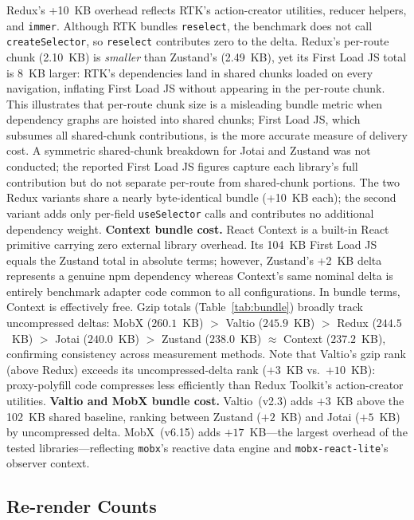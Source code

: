 \documentclass[conference]{IEEEtran}
\newcommand{\code}[1]{\texttt{\small #1}}
\begin{document}
Redux's +10~KB overhead reflects RTK's action-creator utilities,
reducer helpers, and \code{immer}. Although RTK bundles
\code{reselect}, the benchmark does not call \code{createSelector}, so
\code{reselect} contributes zero to the delta. Redux's per-route chunk
(2.10~KB) is \emph{smaller} than Zustand's (2.49~KB), yet its First
Load JS total is 8~KB larger: RTK's dependencies land in shared chunks
loaded on every navigation, inflating First Load JS without appearing in
the per-route chunk. This illustrates that per-route chunk size is a
misleading bundle metric when dependency graphs are hoisted into shared
chunks; First Load JS, which subsumes all shared-chunk contributions,
is the more accurate measure of delivery cost. A symmetric
shared-chunk breakdown for Jotai and Zustand was not conducted; the
reported First Load JS figures capture each library's full contribution
but do not separate per-route from shared-chunk portions. The two Redux variants share a nearly byte-identical bundle (+10~KB each);
the second variant adds only per-field
\code{useSelector} calls and contributes no additional dependency weight.
\textbf{Context bundle cost.} React Context is a built-in React
primitive carrying zero external library overhead. Its 104~KB First
Load JS equals the Zustand total in absolute terms; however, Zustand's
+2~KB delta represents a genuine npm dependency whereas Context's same
nominal delta is entirely benchmark adapter code common to all
configurations. In bundle terms, Context is effectively free.
Gzip totals (Table~\ref{tab:bundle}) broadly track uncompressed deltas:
MobX ($260.1$~KB) $>$ Valtio ($245.9$~KB) $>$ Redux ($244.5$~KB) $>$
Jotai ($240.0$~KB) $>$ Zustand ($238.0$~KB) $\approx$ Context ($237.2$~KB),
confirming consistency across measurement methods.
Note that Valtio's gzip rank (above Redux) exceeds its uncompressed-delta
rank ($+3$~KB vs.~$+10$~KB): proxy-polyfill code compresses less
efficiently than Redux Toolkit's action-creator utilities.
\textbf{Valtio and MobX bundle cost.} Valtio~(v2.3) adds $+3$~KB above
the 102~KB shared baseline, ranking between Zustand ($+2$~KB) and
Jotai ($+5$~KB) by uncompressed delta. MobX~(v6.15) adds $+17$~KB---the
largest overhead of the tested libraries---reflecting \code{mobx}'s
reactive data engine and \code{mobx-react-lite}'s observer context.

\subsection{Re-render Counts}
\end{document}
